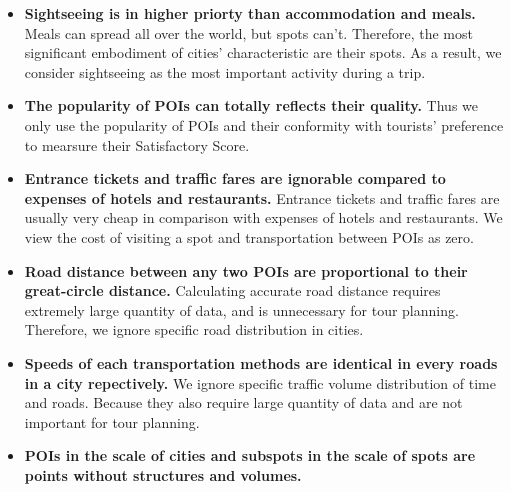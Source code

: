 \documentclass{mcmthesis}
\begin{document}
  \begin{itemize}
    \item \textbf{Sightseeing is in higher priorty than accommodation and meals.} Meals can spread all over the world, but spots can't. Therefore, the most significant embodiment of cities' characteristic are their spots. As a result, we consider sightseeing as the most important activity during a trip. 
    \item \textbf{The popularity of POIs can totally reflects their quality.} Thus we only use the popularity of POIs and their conformity with tourists' preference to mearsure their Satisfactory Score.
    \item \textbf{Entrance tickets and traffic fares are ignorable compared to expenses of hotels and restaurants.} Entrance tickets and traffic fares are usually very cheap in comparison with expenses of hotels and restaurants. We view the cost of visiting a spot and transportation between POIs as zero.
    \item \textbf{Road distance between any two POIs are proportional to their great-circle distance.} Calculating accurate road distance requires extremely large quantity of data, and is unnecessary for tour planning. Therefore, we ignore specific road distribution in cities.
    \item \textbf{Speeds of each transportation methods are identical in every roads in a city repectively.} We ignore specific traffic volume distribution of time and roads. Because they also require large quantity of data and are not important for tour planning.
    \item \textbf{POIs in the scale of cities and subspots in the scale of spots are points without structures and volumes.}
  \end{itemize}
\end{document}
